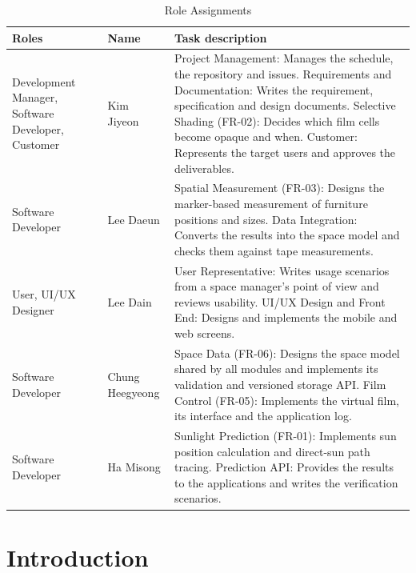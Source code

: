 \documentclass[conference]{IEEEtran}
\newcommand{\gapsection}{\vspace{1.2ex}}
\newcommand{\gapsubsection}{\vspace{0.5ex}}
\begin{document}
\begin{table}[!h]
\caption{Role Assignments}
\label{tab:roles}
\centering
\footnotesize
\setlength{\tabcolsep}{3pt}
\renewcommand{\arraystretch}{1.15}
\begin{tabular}{|L{0.2\columnwidth}|L{0.17\columnwidth}|L{0.48\columnwidth}|}
\hline
Roles & Name & Task description \\
\hline
Development Manager, Software Developer, Customer & Kim Jiyeon &
Project Management: Manages the schedule, the repository and issues.\newline
Requirements and Documentation: Writes the requirement, specification and design documents.\newline
Selective Shading (FR-02): Decides which film cells become opaque and when.\newline
Customer: Represents the target users and approves the deliverables. \\
\hline
Software Developer & Lee Daeun &
Spatial Measurement (FR-03): Designs the marker-based measurement of furniture positions and sizes.\newline
Data Integration: Converts the results into the space model and checks them against tape measurements. \\
\hline
User, UI/UX Designer & Lee Dain &
User Representative: Writes usage scenarios from a space manager's point of view and reviews usability.\newline
UI/UX Design and Front End: Designs and implements the mobile and web screens. \\
\hline
Software Developer & Chung Heegyeong &
Space Data (FR-06): Designs the space model shared by all modules and implements its validation and versioned storage API.\newline
Film Control (FR-05): Implements the virtual film, its interface and the application log. \\
\hline
Software Developer & Ha Misong &
Sunlight Prediction (FR-01): Implements sun position calculation and direct-sun path tracing.\newline
Prediction API: Provides the results to the applications and writes the verification scenarios. \\
\hline
\end{tabular}
\end{table}

\gapsection
\section{Introduction}
\gapsubsection
\end{document}
